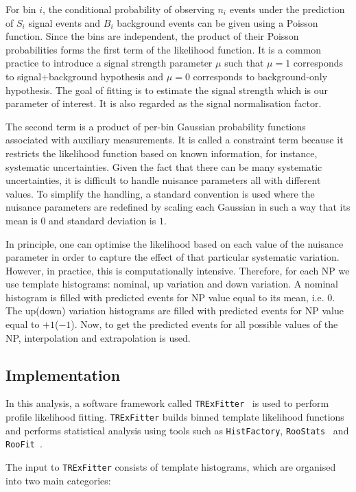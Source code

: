 For bin $i$, the conditional probability of observing $n_i$ events under the 
prediction of $S_i$ signal events and $B_i$ background events can be 
given using a Poisson function. Since the bins are independent, the product of 
their Poisson probabilities forms the first term of the likelihood function. 
It is a common practice to introduce a signal strength
parameter $\mu$ such that $\mu=1$ corresponds to signal+background hypothesis and $\mu=0$
corresponds to background-only hypothesis. The goal of fitting is to estimate the 
signal strength which is our parameter of interest. It is also regarded as the signal normalisation factor.

The second term is a product of per-bin Gaussian probability functions associated with auxiliary measurements.
It is called a constraint term because it restricts the likelihood
function based on known information, for instance, systematic uncertainties. 
Given the fact that there can be many systematic uncertainties, it is difficult to handle
nuisance parameters all with different values. To simplify the handling,
a standard convention is used where the nuisance parameters are redefined
by scaling each Gaussian in such a way that its mean 
is $0$ and standard deviation is $1$.

In principle, one can optimise the likelihood based on each value of the 
nuisance parameter in order to capture the effect of that particular
systematic variation. However, in practice, this is computationally intensive.
Therefore, for each NP we use template histograms: nominal, up variation and down variation.
A nominal histogram is filled with predicted events for NP value equal to its mean, i.e. $0$. 
The up(down) variation histograms are filled with predicted events for NP value equal to $+1$($-1$).
Now, to get the predicted events for all possible values of the NP, interpolation
and extrapolation is used. 

\subsection*{Implementation}

In this analysis, a software framework called \texttt{TRExFitter}~\cite{trex} is 
used to perform profile likelihood fitting. \texttt{TRExFitter} builds binned template 
likelihood functions and performs statistical analysis using tools such as \texttt{HistFactory},
\texttt{RooStats}~\cite{RooStats} and \texttt{RooFit}~\cite{RooFit}.

The input to \texttt{TRExFitter} consists of template histograms, which are organised 
into two main categories:

